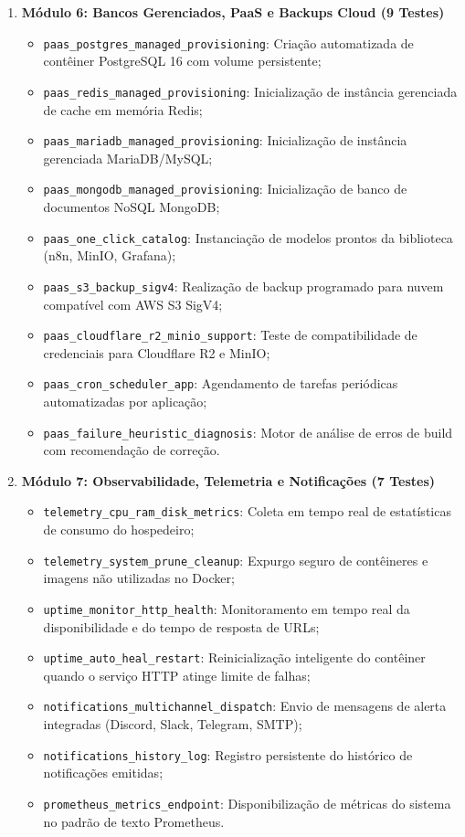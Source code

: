 \begin{enumerate}
    \item \textbf{Módulo 6: Bancos Gerenciados, PaaS e Backups Cloud (9 Testes)}
    \begin{itemize}
        \item \texttt{paas\_postgres\_managed\_provisioning}: Criação automatizada de contêiner PostgreSQL 16 com volume persistente;
        \item \texttt{paas\_redis\_managed\_provisioning}: Inicialização de instância gerenciada de cache em memória Redis;
        \item \texttt{paas\_mariadb\_managed\_provisioning}: Inicialização de instância gerenciada MariaDB/MySQL;
        \item \texttt{paas\_mongodb\_managed\_provisioning}: Inicialização de banco de documentos NoSQL MongoDB;
        \item \texttt{paas\_one\_click\_catalog}: Instanciação de modelos prontos da biblioteca (n8n, MinIO, Grafana);
        \item \texttt{paas\_s3\_backup\_sigv4}: Realização de backup programado para nuvem compatível com AWS S3 SigV4;
        \item \texttt{paas\_cloudflare\_r2\_minio\_support}: Teste de compatibilidade de credenciais para Cloudflare R2 e MinIO;
        \item \texttt{paas\_cron\_scheduler\_app}: Agendamento de tarefas periódicas automatizadas por aplicação;
        \item \texttt{paas\_failure\_heuristic\_diagnosis}: Motor de análise de erros de build com recomendação de correção.
    \end{itemize}

    \item \textbf{Módulo 7: Observabilidade, Telemetria e Notificações (7 Testes)}
    \begin{itemize}
        \item \texttt{telemetry\_cpu\_ram\_disk\_metrics}: Coleta em tempo real de estatísticas de consumo do hospedeiro;
        \item \texttt{telemetry\_system\_prune\_cleanup}: Expurgo seguro de contêineres e imagens não utilizadas no Docker;
        \item \texttt{uptime\_monitor\_http\_health}: Monitoramento em tempo real da disponibilidade e do tempo de resposta de URLs;
        \item \texttt{uptime\_auto\_heal\_restart}: Reinicialização inteligente do contêiner quando o serviço HTTP atinge limite de falhas;
        \item \texttt{notifications\_multichannel\_dispatch}: Envio de mensagens de alerta integradas (Discord, Slack, Telegram, SMTP);
        \item \texttt{notifications\_history\_log}: Registro persistente do histórico de notificações emitidas;
        \item \texttt{prometheus\_metrics\_endpoint}: Disponibilização de métricas do sistema no padrão de texto Prometheus.
    \end{itemize}
\end{enumerate}
